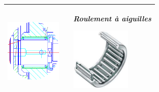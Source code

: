 \documentclass[10pt,oneside]{article}
\begin{document}
\begin{center}
\begin{tabular}{p{} c p{}}
\\
\hline 
\begin{center}
\includegraphics[height=3cm]{png/ex_pivot} 
\end{center}
&&
\begin{center}
\textit{Roulement à aiguilles}

\includegraphics[height=3cm]{png/aiguille} 
\end{center}\\
\hline 
\end{tabular}
\end{center}
\end{document}
